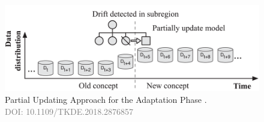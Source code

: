 \begin{enumerate}[label=\Alph*.]
 \begin{figure}[H]
    \centering
    \includegraphics[width=.9\textwidth]{2_Background/figures/partial_update.png}
    \caption{Partial Updating Approach for the Adaptation Phase \cite{8496795}. \\ \textcolor{gray}{\fontsize{10}{0}\selectfont DOI: 10.1109/TKDE.2018.2876857}}
    \label{fig:concept-drift-partial-update}
\end{figure}
\vspace{-6mm}

\end{enumerate}
